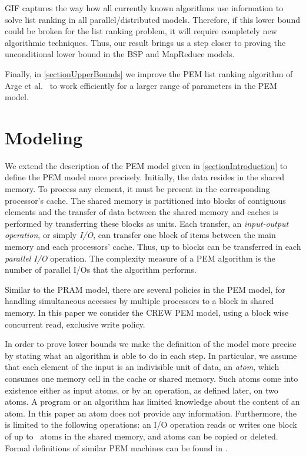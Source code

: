 \documentclass[envcountsame]{llncs}
\begin{document}
GIF captures the way how all currently known algorithms use information to solve list ranking in all parallel/distributed models.
Therefore, if this lower bound could be broken for the list ranking problem, it will require completely new algorithmic techniques.
Thus, our result brings us a step closer to proving the unconditional  lower bound in the BSP and MapReduce models.

Finally, in \autoref{sectionUpperBounds} we improve the PEM list ranking algorithm of Arge et al.~\cite{2010ArgeEtAlGraphAlgoPEM} to work efficiently for a larger range of parameters in the PEM model.  


\section{Modeling}
\label{sectionModelling}

We extend the description of the PEM model given in \autoref{sectionIntroduction} to define the PEM model more precisely. 
Initially, the data resides in the shared memory. 
To process any element, it must be present in the corresponding processor's cache.
The shared memory is partitioned into blocks of  contiguous elements and the transfer of data between the shared memory and caches is performed by transferring these blocks as units.
Each transfer, an {\em input-output operation}, or simply {\em I/O}, can transfer one block of  items between the main memory and each processors' cache. 
Thus, up to  blocks can be transferred in each \emph{parallel I/O} operation. 
The complexity measure of a PEM algorithm is the number of parallel I/Os that the algorithm performs.  

Similar to the PRAM model, there are several policies in the PEM model, for handling simultaneous accesses by multiple processors to a block in shared memory. 
In this paper we consider the CREW PEM model, using a block wise concurrent read, exclusive write policy.




In order to prove lower bounds we make the definition of the model more precise by stating what an algorithm is able to do in each step.
In particular, we assume that each element of the input is an indivisible unit of data, an {\em atom}, which consumes one memory cell in the cache or shared memory.
Such atoms come into existence either as input atoms, or by an operation, as defined later, on two atoms.
A program or an algorithm has limited knowledge about the content of an atom. 
In this paper an atom does not provide any information. 
Furthermore, the \emph{\movePEM} is limited to the following operations: 
an I/O operation reads or writes one block of up to~ atoms in the shared memory, and atoms can be copied or deleted.
Formal definitions of similar PEM machines can be found in \cite{2008ArgeEtAlFundamentalPEM,2012ThesisGero}.
\end{document}

